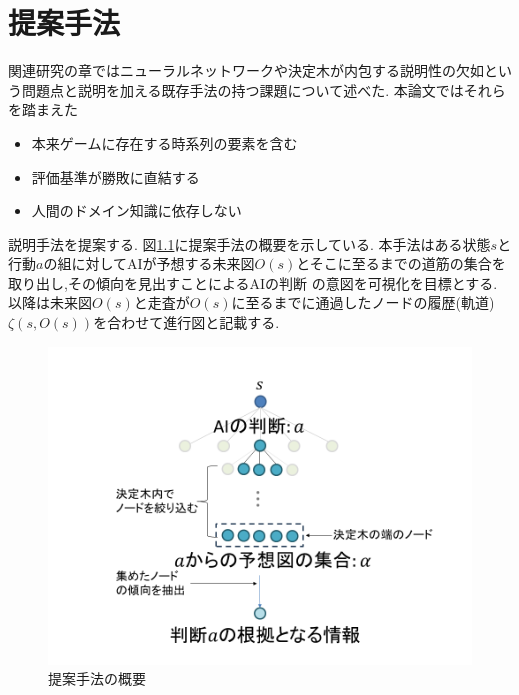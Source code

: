 \chapter{提案手法}
関連研究の章ではニューラルネットワークや決定木が内包する説明性の欠如という問題点と説明を加える既存手法の持つ課題について述べた.
本論文ではそれらを踏まえた
\begin{itemize}
	\item 本来ゲームに存在する時系列の要素を含む
	\item 評価基準が勝敗に直結する
    \item 人間のドメイン知識に依存しない
\end{itemize}
説明手法を提案する.
図\ref{fig:mabs}に提案手法の概要を示している.
本手法はある状態$s$と行動$a$の組に対してAIが予想する未来図$O(s)$とそこに至るまでの道筋の集合を取り出し,その傾向を見出すことによるAIの判断
の意図を可視化を目標とする.
以降は未来図$O(s)$と走査が$O(s)$に至るまでに通過したノードの履歴(軌道)$\zeta(s, O(s))$を合わせて進行図と記載する.
\begin{figure}[t]
    \centering
    \includegraphics[width=\linewidth]{./figure/mabs.png}
    \caption{提案手法の概要}
    \label{fig:mabs}
\end{figure}


